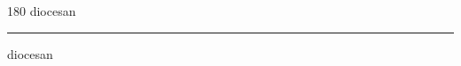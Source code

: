 
\begin{frame}
\begin{center}
\begin{turn}{180}
{\fontsize{2.5cm}{1em}\selectfont diocesan}
\end{turn}
\vspace{1em}\par  
\hrule
\vspace{1em}\par  
{\fontsize{2.5cm}{1em}\selectfont diocesan}
\end{center}
\end{frame}
